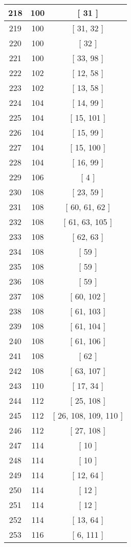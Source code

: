 \begin{center}
\begin{longtable}[H]{|| c c c ||}
\hline
218 & 100 & [ 31 ] \\ 
\hline
219 & 100 & [ 31, 32 ] \\ 
\hline
220 & 100 & [ 32 ] \\ 
\hline
221 & 100 & [ 33, 98 ] \\ 
\hline
222 & 102 & [ 12, 58 ] \\ 
\hline
223 & 102 & [ 13, 58 ] \\ 
\hline
224 & 104 & [ 14, 99 ] \\ 
\hline
225 & 104 & [ 15, 101 ] \\ 
\hline
226 & 104 & [ 15, 99 ] \\ 
\hline
227 & 104 & [ 15, 100 ] \\ 
\hline
228 & 104 & [ 16, 99 ] \\ 
\hline
229 & 106 & [ 4 ] \\ 
\hline
230 & 108 & [ 23, 59 ] \\ 
\hline
231 & 108 & [ 60, 61, 62 ] \\ 
\hline
232 & 108 & [ 61, 63, 105 ] \\ 
\hline
233 & 108 & [ 62, 63 ] \\ 
\hline
234 & 108 & [ 59 ] \\ 
\hline
235 & 108 & [ 59 ] \\ 
\hline
236 & 108 & [ 59 ] \\ 
\hline
237 & 108 & [ 60, 102 ] \\ 
\hline
238 & 108 & [ 61, 103 ] \\ 
\hline
239 & 108 & [ 61, 104 ] \\ 
\hline
240 & 108 & [ 61, 106 ] \\ 
\hline
241 & 108 & [ 62 ] \\ 
\hline
242 & 108 & [ 63, 107 ] \\ 
\hline
243 & 110 & [ 17, 34 ] \\ 
\hline
244 & 112 & [ 25, 108 ] \\ 
\hline
245 & 112 & [ 26, 108, 109, 110 ] \\ 
\hline
246 & 112 & [ 27, 108 ] \\ 
\hline
247 & 114 & [ 10 ] \\ 
\hline
248 & 114 & [ 10 ] \\ 
\hline
249 & 114 & [ 12, 64 ] \\ 
\hline
250 & 114 & [ 12 ] \\ 
\hline
251 & 114 & [ 12 ] \\ 
\hline
252 & 114 & [ 13, 64 ] \\ 
\hline
253 & 116 & [ 6, 111 ] \\ 

\end{longtable}
\end{center}
